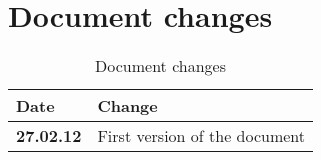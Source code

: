 \newpage

\section{Document changes}

\begin{table}[h!]
\begin{tabular}{ | p{90pt} | p{270pt}  |}
\hline
\bf Date & \bf Change \\ \hline
\bf 27.02.12  &  First version of the document  \\ \hline

\end{tabular}
\caption{Document changes}
\end{table}